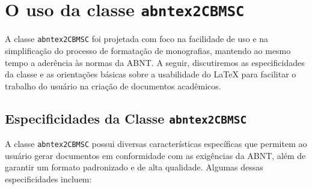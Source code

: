 \chapter{O uso da classe \texttt{abntex2CBMSC}}

A classe \texttt{abntex2CBMSC} foi projetada com foco na facilidade de uso e na simplificação do processo de formatação de monografias, mantendo ao mesmo tempo a aderência às normas da ABNT. A seguir, discutiremos as especificidades da classe e as orientações básicas sobre a usabilidade do LaTeX para facilitar o trabalho do usuário na criação de documentos acadêmicos.

\section{Especificidades da Classe \texttt{abntex2CBMSC}}

A classe \texttt{abntex2CBMSC} possui diversas características específicas que permitem ao usuário gerar documentos em conformidade com as exigências da ABNT, além de garantir um formato padronizado e de alta qualidade. Algumas dessas especificidades incluem:

